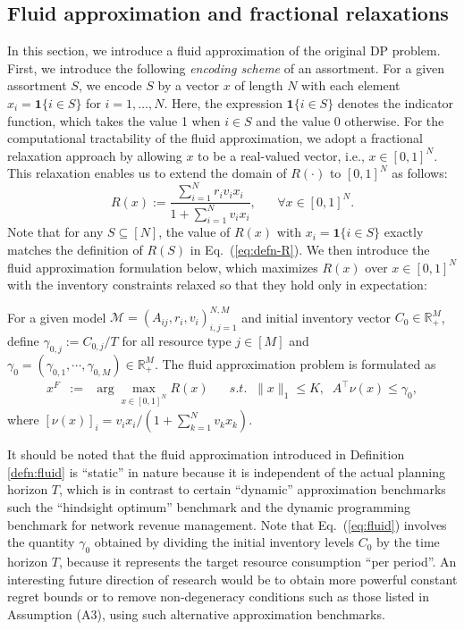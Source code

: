 \documentclass[opre]{informs3aa}
\newcommand{\vct}{\boldsymbol }
\begin{document}
\subsection{Fluid approximation and fractional relaxations}

In this section, we introduce a fluid approximation of the original DP problem. 
First, we introduce the following \emph{encoding scheme} of an assortment. For a given assortment $S$, we encode $S$ by a vector $x$ of length $N$ with each element $x_i=\vct 1\{i\in S\}$ for $i=1,\ldots, N$. Here, the expression $\vct 1\{i\in S\}$ denotes the indicator function, which takes the value 1 when $i \in S$ and the value 0 otherwise. For the computational tractability of the fluid approximation, we adopt a fractional relaxation approach by allowing $x$ to be a real-valued vector, i.e., $x \in [0,1]^N$. This relaxation enables us to extend the domain of $R(\cdot)$ to $[0,1]^N$
as follows:
\begin{equation}
R(x) := \frac{\sum_{i=1}^N r_iv_ix_i}{1+\sum_{i=1}^N v_ix_i}, \;\;\;\;\;\;\forall x\in[0,1]^N.
\end{equation}
Note that for any $S\subseteq[N]$, the value of $R(x)$ with $x_i=\vct 1\{i\in S\}$ exactly matches the definition of $R(S)$ in Eq.~(\ref{eq:defn-R}).
We then introduce the fluid approximation formulation below, which maximizes $R(x)$ over $x\in[0,1]^N$ with the inventory constraints relaxed so that they hold only in expectation:
\begin{definition}
For a given model $\mathcal M=(A_{ij},r_i,v_i)_{i,j=1}^{N,M}$ and initial inventory vector $C_0\in\mathbb R_+^M$,
define $\gamma_{0,j} := C_{0,j}/T$ for all resource type $j\in[M]$ and $\gamma_0=(\gamma_{0,1},\cdots,\gamma_{0,M})\in\mathbb R_+^M$.
The fluid approximation problem is formulated as
\begin{eqnarray}
x^F &:=& \arg\max_{x\in[0,1]^N} R(x)\;\;\;\;\;\;s.t.\;\; \|x\|_1\leq K,\;\; A^\top \nu(x) \leq \gamma_0,
\label{eq:fluid}
\end{eqnarray}
where $[\nu(x)]_i = v_ix_i/(1+\sum_{k=1}^N v_kx_k)$.
\label{defn:fluid}
\end{definition}

{
It should be noted that the fluid approximation introduced in Definition \ref{defn:fluid} is ``static'' in nature because it is independent of the actual planning horizon $T$,
which is in contrast to certain ``dynamic'' approximation benchmarks such the ``hindsight optimum'' benchmark \citep{Wang2020resolve}
and the dynamic programming benchmark \citep{Wang2020constant} for network revenue management.
{Note that Eq.~(\ref{eq:fluid}) involves the quantity $\gamma_0$ obtained by dividing the initial inventory levels $C_0$ by the time horizon $T$, because it represents the target resource consumption ``per period''.}
An interesting future direction of research would be
to obtain more powerful constant regret bounds or to remove non-degeneracy conditions such as those listed in Assumption (A3), 
using such alternative approximation benchmarks.
}
\end{document}
